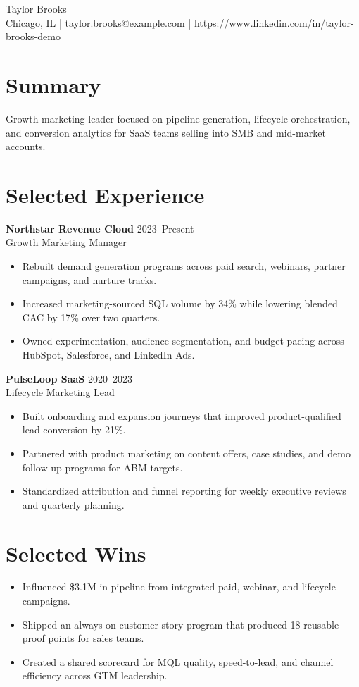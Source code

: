 \documentclass[10pt]{article}
\begin{document}
\begin{center}
  {\LARGE Taylor Brooks}\\
  Chicago, IL \quad | \quad taylor.brooks@example.com \quad | \quad
  https://www.linkedin.com/in/taylor-brooks-demo
\end{center}

\section*{Summary}
Growth marketing leader focused on pipeline generation, lifecycle orchestration,
and conversion analytics for SaaS teams selling into SMB and mid-market accounts.

\section*{Selected Experience}
\textbf{Northstar Revenue Cloud} \hfill 2023--Present\\
Growth Marketing Manager
\begin{itemize}
  \item Rebuilt \underline{demand generation} programs across paid search, webinars, partner campaigns, and nurture tracks.
  \item Increased marketing-sourced SQL volume by 34\% while lowering blended CAC by 17\% over two quarters.
  \item Owned experimentation, audience segmentation, and budget pacing across HubSpot, Salesforce, and LinkedIn Ads.
\end{itemize}

\textbf{PulseLoop SaaS} \hfill 2020--2023\\
Lifecycle Marketing Lead
\begin{itemize}
  \item Built onboarding and expansion journeys that improved product-qualified lead conversion by 21\%.
  \item Partnered with product marketing on content offers, case studies, and demo follow-up programs for ABM targets.
  \item Standardized attribution and funnel reporting for weekly executive reviews and quarterly planning.
\end{itemize}

\section*{Selected Wins}
\begin{itemize}
  \item Influenced \$3.1M in pipeline from integrated paid, webinar, and lifecycle campaigns.
  \item Shipped an always-on customer story program that produced 18 reusable proof points for sales teams.
  \item Created a shared scorecard for MQL quality, speed-to-lead, and channel efficiency across GTM leadership.
\end{itemize}
\end{document}
